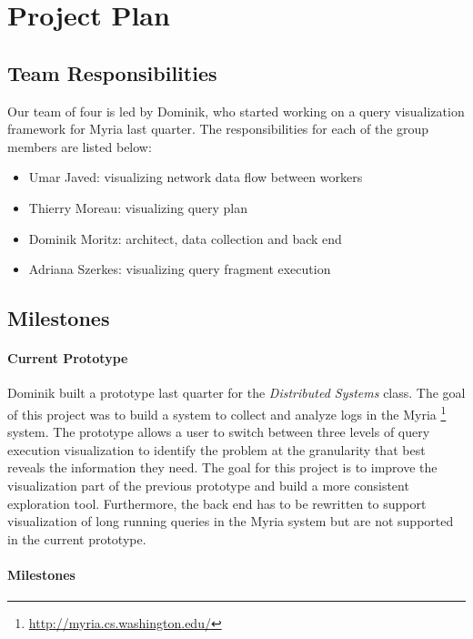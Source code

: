 \section{Project Plan}

\subsection{Team Responsibilities}

Our team of four is led by Dominik, who started working on a query visualization framework for Myria last quarter. The responsibilities for each of the group members are listed below:

\begin {itemize}
    \item Umar Javed: visualizing network data flow between workers
    \item Thierry Moreau: visualizing query plan
    \item Dominik Moritz: architect, data collection and back end
    \item Adriana Szerkes: visualizing query fragment execution
\end{itemize}

\subsection{Milestones}

\paragraph{Current Prototype}

Dominik built a prototype last quarter for the \emph{Distributed Systems} class. The goal of this project was to build a system to collect and analyze logs in the Myria \footnote{\url{http://myria.cs.washington.edu/}} system. The prototype allows a user to switch between three levels of query execution visualization to identify the problem at the granularity that best reveals the information they need. The goal for this project is to improve the visualization part of the previous prototype and build a more consistent exploration tool. Furthermore, the back end has to be rewritten to support visualization of long running queries in the Myria system but are not supported in the current prototype.

\paragraph{Milestones}

